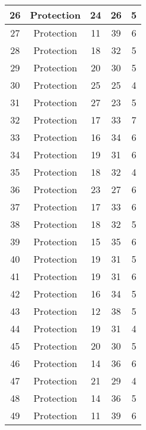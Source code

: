 \documentclass[results.tex]{subfiles}
\begin{document}
\begin{center}
\begin{tabular}{| c || c | c | c | c |}
    \hline
    26 & Protection & 24 & 26 & 5 \\ 
    \hline
    27 & Protection & 11 & 39 & 6 \\ 
    \hline
    28 & Protection & 18 & 32 & 5 \\ 
    \hline
    29 & Protection & 20 & 30 & 5 \\ 
    \hline
    30 & Protection & 25 & 25 & 4 \\ 
    \hline
    31 & Protection & 27 & 23 & 5 \\ 
    \hline
    32 & Protection & 17 & 33 & 7 \\ 
    \hline
    33 & Protection & 16 & 34 & 6 \\ 
    \hline
    34 & Protection & 19 & 31 & 6 \\ 
    \hline
    35 & Protection & 18 & 32 & 4 \\ 
    \hline
    36 & Protection & 23 & 27 & 6 \\ 
    \hline
    37 & Protection & 17 & 33 & 6 \\ 
    \hline
    38 & Protection & 18 & 32 & 5 \\ 
    \hline
    39 & Protection & 15 & 35 & 6 \\ 
    \hline
    40 & Protection & 19 & 31 & 5 \\ 
    \hline
    41 & Protection & 19 & 31 & 6 \\ 
    \hline
    42 & Protection & 16 & 34 & 5 \\ 
    \hline
    43 & Protection & 12 & 38 & 5 \\ 
    \hline
    44 & Protection & 19 & 31 & 4 \\ 
    \hline
    45 & Protection & 20 & 30 & 5 \\ 
    \hline
    46 & Protection & 14 & 36 & 6 \\ 
    \hline
    47 & Protection & 21 & 29 & 4 \\ 
    \hline
    48 & Protection & 14 & 36 & 5 \\ 
    \hline
    49 & Protection & 11 & 39 & 6 \\ 
    \hline   \end{tabular}
\end{center}
\end{document}
